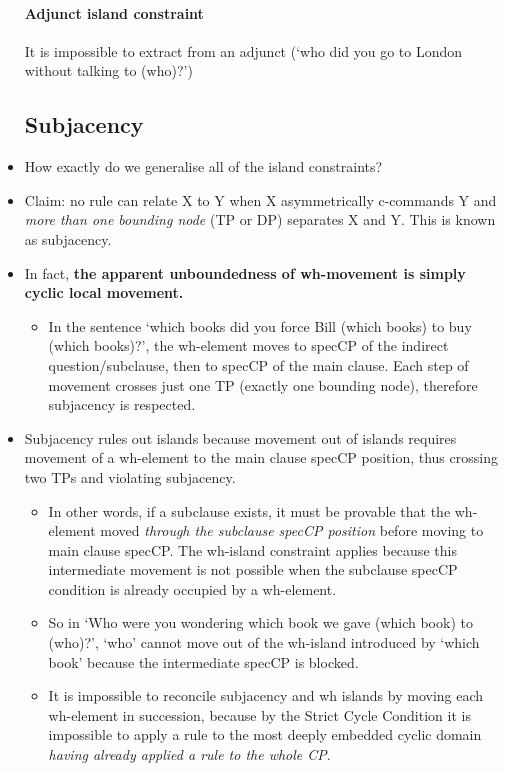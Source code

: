 \documentclass{article}
\begin{document}
\begin{itemize}
    \paragraph{Adjunct island constraint} It is impossible to extract from an adjunct (`who did you go to London without talking to (who)?')
    \subsection{Subjacency}
    \item How exactly do we generalise all of the island constraints?
    \item Claim: no rule can relate X to Y when X asymmetrically c-commands Y and \textit{more than one bounding node} (TP or DP) separates X and Y. This is known as subjacency.
    \item In fact, \textbf{the apparent unboundedness of wh-movement is simply cyclic local movement.} 
    \begin{itemize}
        \item In the sentence `which books did you force Bill (which books) to buy (which books)?', the wh-element moves to specCP of the indirect question/subclause, then to specCP of the main clause. Each step of movement crosses just one TP (exactly one bounding node), therefore subjacency is respected.
    \end{itemize}
    \item Subjacency rules out islands because movement out of islands requires movement of a wh-element to the main clause specCP position, thus crossing two TPs and violating subjacency.
    \begin{itemize}
        \item In other words, if a subclause exists, it must be provable that the wh-element moved \textit{through the subclause specCP position} before moving to main clause specCP. The wh-island constraint applies because this intermediate movement is not possible when the subclause specCP condition is already occupied by a wh-element.
        \item So in `Who were you wondering which book we gave (which book) to (who)?', `who' cannot move out of the wh-island introduced by `which book' because the intermediate specCP is blocked.
        \item It is impossible to reconcile subjacency and wh islands by moving each wh-element in succession, because by the Strict Cycle Condition it is impossible to apply a rule to the most deeply embedded cyclic domain \textit{having already applied a rule to the whole CP}.
    \end{itemize}

\end{itemize}
\end{document}
